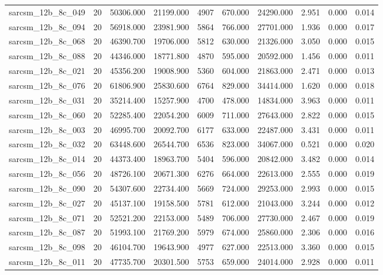 \begin{tabular}{lrrrrrrrrr}
sarcsm\_12b\_8c\_049 & 20 & 50306.000 & 21199.000 & 4907 & 670.000 & 24290.000 & 2.951 & 0.000 & 0.014 \\
sarcsm\_12b\_8c\_094 & 20 & 56918.000 & 23981.900 & 5864 & 766.000 & 27701.000 & 1.936 & 0.000 & 0.017 \\
sarcsm\_12b\_8c\_068 & 20 & 46390.700 & 19706.000 & 5812 & 630.000 & 21326.000 & 3.050 & 0.000 & 0.015 \\
sarcsm\_12b\_8c\_088 & 20 & 44346.000 & 18771.800 & 4870 & 595.000 & 20592.000 & 1.456 & 0.000 & 0.011 \\
sarcsm\_12b\_8c\_021 & 20 & 45356.200 & 19008.900 & 5360 & 604.000 & 21863.000 & 2.471 & 0.000 & 0.013 \\
sarcsm\_12b\_8c\_076 & 20 & 61806.900 & 25830.600 & 6764 & 829.000 & 34414.000 & 1.620 & 0.000 & 0.018 \\
sarcsm\_12b\_8c\_031 & 20 & 35214.400 & 15257.900 & 4700 & 478.000 & 14834.000 & 3.963 & 0.000 & 0.011 \\
sarcsm\_12b\_8c\_060 & 20 & 52285.400 & 22054.200 & 6009 & 711.000 & 27643.000 & 2.822 & 0.000 & 0.015 \\
sarcsm\_12b\_8c\_003 & 20 & 46995.700 & 20092.700 & 6177 & 633.000 & 22487.000 & 3.431 & 0.000 & 0.011 \\
sarcsm\_12b\_8c\_032 & 20 & 63448.600 & 26544.700 & 6536 & 823.000 & 34067.000 & 0.521 & 0.000 & 0.020 \\
sarcsm\_12b\_8c\_014 & 20 & 44373.400 & 18963.700 & 5404 & 596.000 & 20842.000 & 3.482 & 0.000 & 0.014 \\
sarcsm\_12b\_8c\_056 & 20 & 48726.100 & 20671.300 & 6276 & 664.000 & 22613.000 & 2.555 & 0.000 & 0.019 \\
sarcsm\_12b\_8c\_090 & 20 & 54307.600 & 22734.400 & 5669 & 724.000 & 29253.000 & 2.993 & 0.000 & 0.015 \\
sarcsm\_12b\_8c\_027 & 20 & 45137.100 & 19158.500 & 5781 & 612.000 & 21043.000 & 3.244 & 0.000 & 0.012 \\
sarcsm\_12b\_8c\_071 & 20 & 52521.200 & 22153.000 & 5489 & 706.000 & 27730.000 & 2.467 & 0.000 & 0.019 \\
sarcsm\_12b\_8c\_087 & 20 & 51993.100 & 21769.200 & 5979 & 674.000 & 25860.000 & 2.306 & 0.000 & 0.016 \\
sarcsm\_12b\_8c\_098 & 20 & 46104.700 & 19643.900 & 4977 & 627.000 & 22513.000 & 3.360 & 0.000 & 0.015 \\
sarcsm\_12b\_8c\_011 & 20 & 47735.700 & 20301.500 & 5753 & 659.000 & 24014.000 & 2.928 & 0.000 & 0.011 \\

\end{tabular}
